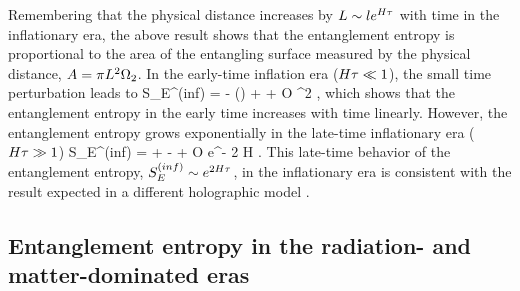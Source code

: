 \documentclass[12pt]{article}
\begin{document}
Remembering that the physical distance increases by $L\sim l e^{H \tau}$ with time in the inflationary era, the above result shows that the entanglement entropy is proportional to the area of the entangling surface measured by the physical distance, $A = \pi L^2 \Omega_2$. In the early-time inflation era ($H \tau \ll 1$), the small time perturbation leads to 
\be
S_E^{(inf)} = - \log \left(\right) +   + {\cal O} \ls  \tau^2 \rs ,
\ee
which shows that the entanglement entropy in the early time increases with time linearly. However, the entanglement entropy grows exponentially in the late-time inflationary era  ($ H \tau  \gg 1$) 
\be
S_E^{(inf)} =
+  - + {\cal O} \ls  e^{- 2 H \tau }\rs  .
\ee
This late-time behavior of the entanglement entropy, $S_E^{(inf)} \sim e^{2 H \tau}$, in the inflationary era is consistent with the result expected in a different  holographic model \cite{Koh:2018rsw}. 

\subsection{Entanglement entropy in the radiation- and matter-dominated eras}
\end{document}
